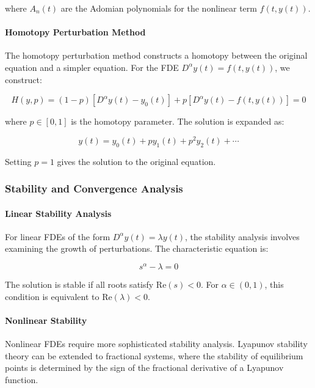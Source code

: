 where $A_n(t)$ are the Adomian polynomials for the nonlinear term $f(t, y(t))$.

\paragraph{Homotopy Perturbation Method}

The homotopy perturbation method constructs a homotopy between the original equation and a simpler equation. For the FDE $D^{\alpha} y(t) = f(t, y(t))$, we construct:

\begin{equation}
H(y, p) = (1-p)[D^{\alpha} y(t) - y_0(t)] + p[D^{\alpha} y(t) - f(t, y(t))] = 0
\end{equation}

where $p \in [0,1]$ is the homotopy parameter. The solution is expanded as:

\begin{equation}
y(t) = y_0(t) + p y_1(t) + p^2 y_2(t) + \cdots
\end{equation}

Setting $p = 1$ gives the solution to the original equation.

\subsubsection{Stability and Convergence Analysis}

\paragraph{Linear Stability Analysis}

For linear FDEs of the form $D^{\alpha} y(t) = \lambda y(t)$, the stability analysis involves examining the growth of perturbations. The characteristic equation is:

\begin{equation}
s^{\alpha} - \lambda = 0
\end{equation}

The solution is stable if all roots satisfy $\text{Re}(s) < 0$. For $\alpha \in (0,1)$, this condition is equivalent to $\text{Re}(\lambda) < 0$.

\paragraph{Nonlinear Stability}

Nonlinear FDEs require more sophisticated stability analysis. Lyapunov stability theory can be extended to fractional systems, where the stability of equilibrium points is determined by the sign of the fractional derivative of a Lyapunov function.


